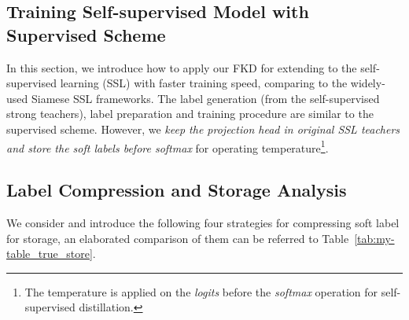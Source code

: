 \documentclass[10pt,twocolumn,letterpaper]{article}
\begin{document}
\subsection{Training Self-supervised Model with Supervised Scheme}
\vspace{-0.05in}

In this section, we introduce how to apply our FKD for extending to the self-supervised learning (SSL) with faster training speed, comparing to the widely-used Siamese SSL frameworks. The label generation (from the self-supervised strong teachers), label preparation and training procedure are similar to the supervised scheme. However, we {\em keep the projection head in original SSL teachers and store the soft labels before softmax} for operating temperature\footnote{The temperature  is applied on the {\em logits} before the {\em softmax} operation for self-supervised distillation.}.

\subsection{Label Compression and Storage Analysis} \label{storage_s}
We consider and introduce the following four strategies for compressing soft label for storage, an elaborated comparison of them can be referred to Table~\ref{tab:my-table_true_store}.
\vspace{-0.12in}
\end{document}
